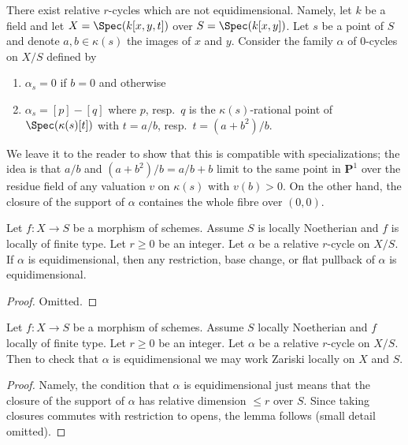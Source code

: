 \begin{example}
\label{example-not-equidimensional}
\begin{reference}
\cite[Example 3.1.9]{SV}
\end{reference}
There exist relative $r$-cycles which are not equidimensional.
Namely, let $k$ be a field and let $X = \Spec(k[x, y, t])$
over $S = \Spec(k[x, y])$. Let $s$ be a point of $S$ and
denote $a, b \in \kappa(s)$ the images of $x$ and $y$.
Consider the family $\alpha$ of $0$-cycles on $X/S$ defined by
\begin{enumerate}
\item $\alpha_s = 0$ if $b = 0$ and otherwise
\item $\alpha_s = [p] - [q]$ where $p$, resp.\ $q$ is the $\kappa(s)$-rational
point of $\Spec(\kappa(s)[t])$ with $t = a/b$,
resp.\ $t = (a + b^2)/b$.
\end{enumerate}
We leave it to the reader to show that this is compatible with specializations;
the idea is that $a/b$ and $(a + b^2)/b = a/b + b$ limit to the same point
in $\mathbf{P}^1$ over the residue field of any valuation $v$ on $\kappa(s)$
with $v(b) > 0$. On the other hand, the closure of the support of $\alpha$
containes the whole fibre over $(0, 0)$.
\end{example}

\begin{lemma}
\label{lemma-equidimensional-functoriality}
Let $f : X \to S$ be a morphism of schemes. Assume $S$ is locally Noetherian
and $f$ is locally of finite type. Let $r \geq 0$ be an integer. Let
$\alpha$ be a relative $r$-cycle on $X/S$. If $\alpha$ is equidimensional,
then any restriction, base change, or flat pullback of $\alpha$ is
equidimensional.
\end{lemma}

\begin{proof}
Omitted.
\end{proof}

\begin{lemma}
\label{lemma-check-equidimensional}
Let $f : X \to S$ be a morphism of schemes. Assume $S$ locally Noetherian
and $f$ locally of finite type. Let $r \geq 0$ be an integer. Let $\alpha$
be a relative $r$-cycle on $X/S$. Then to check that $\alpha$ is equidimensional
we may work Zariski locally on $X$ and $S$.
\end{lemma}

\begin{proof}
Namely, the condition that $\alpha$ is equidimensional just means that
the closure of the support of $\alpha$ has relative dimension $\leq r$
over $S$. Since taking closures commutes with restriction to opens,
the lemma follows (small detail omitted).
\end{proof}

